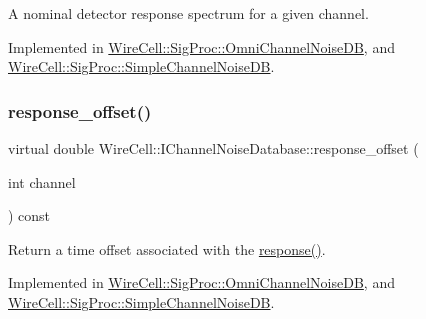 A nominal detector response spectrum for a given channel. 



Implemented in \hyperlink{class_wire_cell_1_1_sig_proc_1_1_omni_channel_noise_d_b_ae269e377629b9a96c8e0cdb0f30353a4}{Wire\+Cell\+::\+Sig\+Proc\+::\+Omni\+Channel\+Noise\+DB}, and \hyperlink{class_wire_cell_1_1_sig_proc_1_1_simple_channel_noise_d_b_ac86433de014502928205161b6ea93ba0}{Wire\+Cell\+::\+Sig\+Proc\+::\+Simple\+Channel\+Noise\+DB}.

\mbox{\label{class_wire_cell_1_1_i_channel_noise_database_a5a1d081b5cd6d32ac7209b99eb2c61dc}} 
\subsubsection{\texorpdfstring{response\+\_\+offset()}{response\_offset()}}
{\footnotesize\ttfamily virtual double Wire\+Cell\+::\+I\+Channel\+Noise\+Database\+::response\+\_\+offset (\begin{DoxyParamCaption}\item[{int}]{channel }\end{DoxyParamCaption}) const\hspace{0.3cm}{\ttfamily [pure virtual]}}



Return a time offset associated with the \hyperlink{class_wire_cell_1_1_i_channel_noise_database_ad3c42f59a26e8a8e115199a894d881da}{response()}. 



Implemented in \hyperlink{class_wire_cell_1_1_sig_proc_1_1_omni_channel_noise_d_b_a0b6fa7b4d342adf1313b86684b811023}{Wire\+Cell\+::\+Sig\+Proc\+::\+Omni\+Channel\+Noise\+DB}, and \hyperlink{class_wire_cell_1_1_sig_proc_1_1_simple_channel_noise_d_b_a089731ed6979ee7a3d5029dc6c104902}{Wire\+Cell\+::\+Sig\+Proc\+::\+Simple\+Channel\+Noise\+DB}.

\mbox{\label{class_wire_cell_1_1_i_channel_noise_database_a82406ba30d65412db34e038e789be95c}} 
